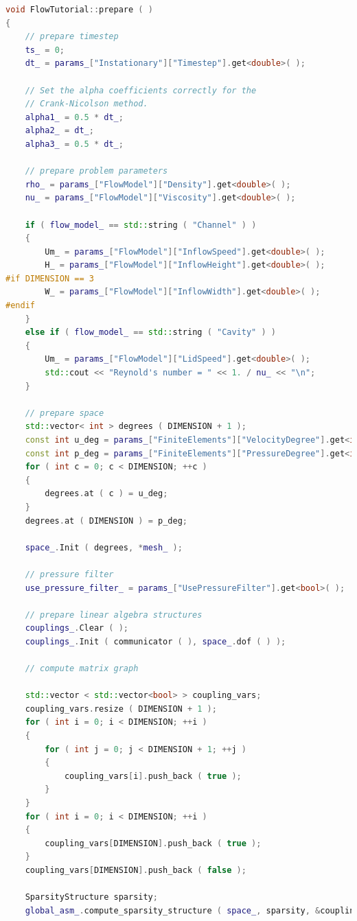 \documentclass[a4paper, 11pt, twoside]{article}
\begin{document}
\begin{lstlisting}[language=C++, basicstyle={\footnotesize, \ttfamily}, keywordstyle=\color{blue},  numbers=none, tabsize=4]
void FlowTutorial::prepare ( )
{
    // prepare timestep
    ts_ = 0;
    dt_ = params_["Instationary"]["Timestep"].get<double>( );

    // Set the alpha coefficients correctly for the
    // Crank-Nicolson method.
    alpha1_ = 0.5 * dt_;
    alpha2_ = dt_;
    alpha3_ = 0.5 * dt_;

    // prepare problem parameters
    rho_ = params_["FlowModel"]["Density"].get<double>( );
    nu_ = params_["FlowModel"]["Viscosity"].get<double>( );

    if ( flow_model_ == std::string ( "Channel" ) )
    {
        Um_ = params_["FlowModel"]["InflowSpeed"].get<double>( );
        H_ = params_["FlowModel"]["InflowHeight"].get<double>( );
#if DIMENSION == 3
        W_ = params_["FlowModel"]["InflowWidth"].get<double>( );
#endif
    }
    else if ( flow_model_ == std::string ( "Cavity" ) )
    {
        Um_ = params_["FlowModel"]["LidSpeed"].get<double>( );
        std::cout << "Reynold's number = " << 1. / nu_ << "\n";
    }

    // prepare space
    std::vector< int > degrees ( DIMENSION + 1 );
    const int u_deg = params_["FiniteElements"]["VelocityDegree"].get<int>( );
    const int p_deg = params_["FiniteElements"]["PressureDegree"].get<int>( );
    for ( int c = 0; c < DIMENSION; ++c )
    {
        degrees.at ( c ) = u_deg;
    }
    degrees.at ( DIMENSION ) = p_deg;

    space_.Init ( degrees, *mesh_ );

    // pressure filter
    use_pressure_filter_ = params_["UsePressureFilter"].get<bool>( );

    // prepare linear algebra structures
    couplings_.Clear ( );
    couplings_.Init ( communicator ( ), space_.dof ( ) );

    // compute matrix graph

    std::vector < std::vector<bool> > coupling_vars;
    coupling_vars.resize ( DIMENSION + 1 );
    for ( int i = 0; i < DIMENSION; ++i )
    {
        for ( int j = 0; j < DIMENSION + 1; ++j )
        {
            coupling_vars[i].push_back ( true );
        }
    }
    for ( int i = 0; i < DIMENSION; ++i )
    {
        coupling_vars[DIMENSION].push_back ( true );
    }
    coupling_vars[DIMENSION].push_back ( false );

    SparsityStructure sparsity;
    global_asm_.compute_sparsity_structure ( space_, sparsity, &coupling_vars );


\end{lstlisting}
\end{document}
